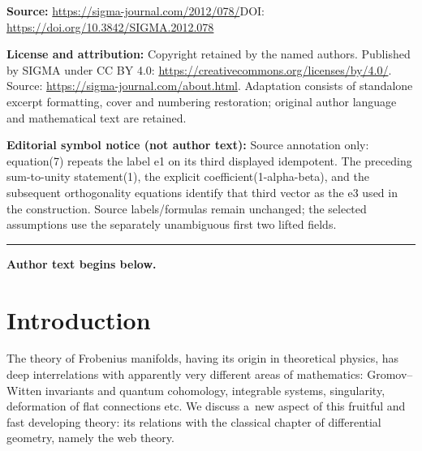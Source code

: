 \documentclass[11pt]{article}
\begin{document}
\noindent\textbf{Source:} \url{https://sigma-journal.com/2012/078/}\quad DOI: \url{https://doi.org/10.3842/SIGMA.2012.078}\par
\noindent\textbf{License and attribution:} Copyright retained by the named authors. Published by SIGMA under CC BY 4.0: \url{https://creativecommons.org/licenses/by/4.0/}. Source: \url{https://sigma-journal.com/about.html}. Adaptation consists of standalone excerpt formatting, cover and numbering restoration; original author language and mathematical text are retained.\par
\noindent\textbf{Editorial symbol notice (not author text):} Source annotation only: equation(7) repeats the label e1 on its third displayed idempotent. The preceding sum-to-unity statement(1), the explicit coefficient(1-alpha-beta), and the subsequent orthogonality equations identify that third vector as the e3 used in the construction. Source labels/formulas remain unchanged; the selected assumptions use the separately unambiguous first two lifted fields.\par
\medskip\hrule\medskip\noindent\textbf{Author text begins below.}\par
\setcounter{section}{0}
\setcounter{subsection}{0}
\setcounter{subsubsection}{0}
\setcounter{equation}{0}
\section{Introduction}

The theory of Frobenius manifolds, having its origin in theoretical physics, has deep interrelations with apparently very dif\/ferent areas of mathematics: Gromov--Witten invariants and quantum cohomology, integrable systems, singularity, deformation of f\/lat connections etc.
We discuss a~new aspect of this fruitful and fast developing theory: its relations with the classical chapter of dif\/ferential geometry, namely the web theory.
\end{document}

